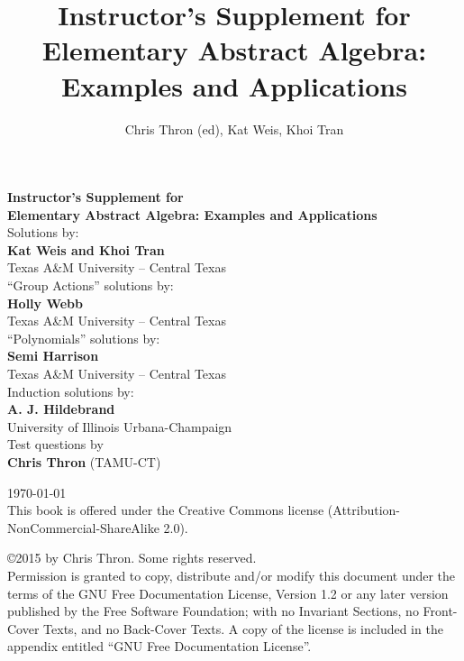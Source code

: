 \documentclass[11pt]{book}
\begin{document}
%
\begin{titlepage}
\title{Instructor's Supplement for Elementary Abstract Algebra: Examples and Applications}
\author{Chris Thron (ed), Kat Weis, Khoi Tran}
\begin{center}
\vspace{3.5cm}
{\huge \textbf{Instructor's Supplement for}\\
\textbf{ Elementary Abstract Algebra: Examples and Applications}}\\[1cm]
Solutions by: \\ 
{ \textbf{Kat Weis and Khoi Tran } } \\
Texas A\&M University -- Central Texas \\[0.4cm]
``Group Actions'' solutions by: \\ 
{ \textbf{Holly Webb} } \\
Texas A\&M University -- Central Texas \\[0.4cm]
``Polynomials'' solutions by: \\ 
{ \textbf{Semi Harrison } } \\
Texas A\&M University -- Central Texas \\[0.4cm]
Induction solutions by: \\ 
{ \textbf{A. J. Hildebrand } } \\
University of Illinois Urbana-Champaign \\[0.4cm]

Test questions by\\
\textbf {Chris Thron} (TAMU-CT)\\[0.4cm]

\vfill

{\large \today}\\ [1 cm]
This book is offered under the Creative Commons license (Attribution-NonCommercial-ShareAlike 2.0).

\end{center}
\end{titlepage}
\vspace{4cm}


\vfill
\copyright 2015 by Chris Thron. Some rights reserved.\\

Permission is granted to copy, distribute and/or modify this document under the terms of the GNU Free Documentation License, Version 1.2 or any later version published by the Free Software Foundation; with no Invariant Sections, no Front-Cover Texts, and no Back-Cover Texts.  A copy of the license is included in the appendix entitled ``GNU Free Documentation License''.
\end{document}

